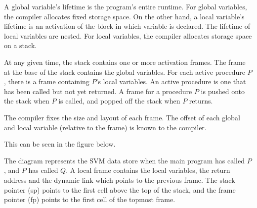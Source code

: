 \documentclass[a4paper, openany]{memoir}
\begin{document}
A global variable's lifetime is the program's entire runtime. For global variables, the compiler allocates fixed storage space. On the other hand, a local variable's lifetime is an activation of the block in which variable is declared. The lifetime of local variables are nested. For local variables, the compiler allocates storage space on a stack.

At any given time, the stack contains one or more activation frames. The frame at the base of the stack contains the global variables. For each active procedure $P$, there is a frame containing $P$'s local variables. An active procedure is one that has been called but not yet returned. A frame for a procedure $P$ is pushed onto the stack when $P$ is called, and popped off the stack when $P$ returns.

The compiler fixes the size and layout of each frame. The offset of each global and local variable (relative to the frame) is known to the compiler.

This can be seen in the figure below.
\begin{figure}[H]
    \centering
\end{figure}
\noindent The diagram represents the SVM data store when the main program has called $P$, and $P$ has called $Q$. A local frame contains the local variables, the return address and the dynamic link which points to the previous frame. The stack pointer (sp) points to the first cell above the top of the stack, and the frame pointer (fp) points to the first cell of the topmost frame.
\end{document}
